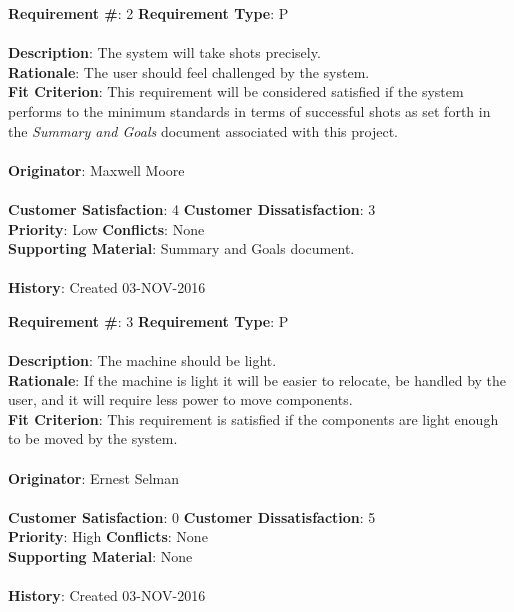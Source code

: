 \documentclass[titlepage]{article}
\begin{document}
\newpage
\begin{framed}
	\noindent\textbf{Requirement \#}: 2 \hfill \textbf{Requirement Type}: P\hfill\\\\
	\noindent\textbf{Description}: The system will take shots precisely.\\
	\textbf{Rationale}: The user should feel challenged by the system.\\
	\textbf{Fit Criterion}: This requirement will be considered satisfied if the system performs to the minimum standards in terms of successful shots as set forth in the \textit{Summary and Goals} document associated with this project.\\\\
	\textbf{Originator}: Maxwell Moore\\\\
	\noindent\textbf{Customer Satisfaction}: 4 \hfill 	\textbf{Customer Dissatisfaction}: 3\hfill\\
	\textbf{Priority}: Low \hfill \textbf{Conflicts}: None \hfill\\
	\textbf{Supporting Material}: Summary and Goals document.\\\\
	\noindent\textbf{History}: Created 03-NOV-2016
\end{framed}

\begin{framed}
	\noindent\textbf{Requirement \#}: 3 \hfill \textbf{Requirement Type}: P \hfill\\\\
	\noindent\textbf{Description}: The machine should be light.\\
	\textbf{Rationale}: If the machine is light it will be easier to relocate, be handled by the user, and it will require less power to move components.\\
	\textbf{Fit Criterion}: This requirement is satisfied if the components are light enough to be moved by the system.\\\\
	\textbf{Originator}: Ernest Selman\\\\
	\noindent\textbf{Customer Satisfaction}: 0 \hfill 	\textbf{Customer Dissatisfaction}: 5 \hfill\\
	\textbf{Priority}: High \hfill \textbf{Conflicts}: None \hfill\\
	\textbf{Supporting Material}: None\\\\
	\noindent\textbf{History}: Created 03-NOV-2016
\end{framed}
\end{document}
